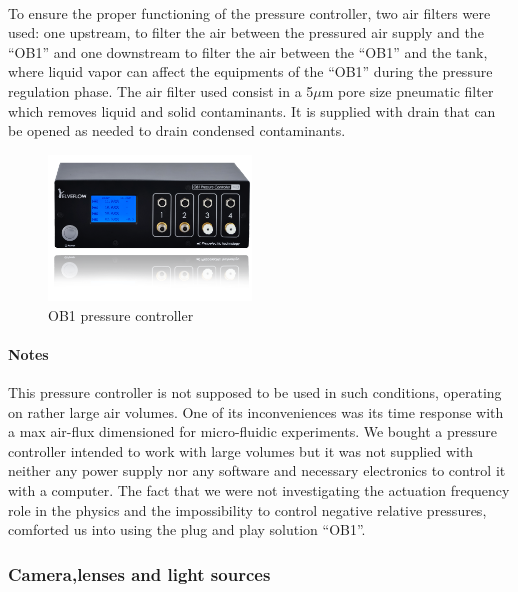 \paragraph{}
To ensure the proper functioning of the pressure controller, two air filters were used: one upstream, to filter the air between the pressured air supply and the "`OB1"' and one downstream to filter the air between the "`OB1"' and the tank, where liquid vapor can affect the equipments of the "`OB1"' during the pressure regulation phase.
The air filter used consist in a 5$\mu$m pore size pneumatic filter which removes liquid and solid contaminants. It is supplied with drain that can be opened as needed to drain condensed contaminants.
\begin{figure}[H] %
	\centering%
  \includegraphics[width=0.48\textwidth]{figures/Chapter_1/OB1.png}
	\caption{OB1 pressure controller}
	\label{fig:ob1}
\end{figure}
\paragraph{Notes}
This pressure controller is not supposed to be used in such conditions, operating on rather large air volumes. One of its inconveniences was its time response with a max air-flux dimensioned for micro-fluidic experiments. We bought a pressure controller intended to work with large volumes but it was not supplied with neither any power supply nor any software and necessary electronics to control it with a computer. The fact that we were not investigating the actuation frequency role in the physics and the impossibility to control negative relative pressures, comforted us into using the plug and play solution "`OB1"'.

\subsubsection{Camera,lenses and light sources}
\label{sssection:CLLS}
